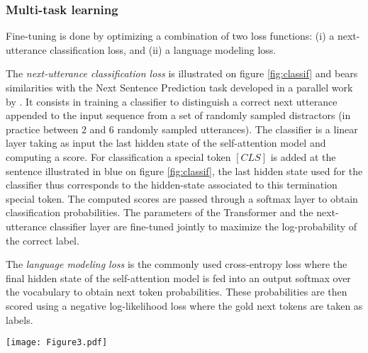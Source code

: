 \documentclass[letterpaper]{article} \usepackage{aaai19}  \usepackage{times}  \usepackage{helvet}  \usepackage{courier}  \usepackage{url}  \usepackage{graphicx}  \usepackage{natbib}
\begin{document}
\subsubsection{Multi-task learning}
Fine-tuning is done by optimizing a combination of two loss functions: (i) a next-utterance classification loss, and (ii) a language modeling loss.

The \textit{next-utterance classification loss} is illustrated on figure \ref{fig:classif} and bears similarities with the Next Sentence Prediction task developed in a parallel work by \citeauthor{devlin_bert:_2018}. It consists in training a classifier to distinguish a correct next utterance appended to the input sequence from a set of randomly sampled distractors (in practice between 2 and 6 randomly sampled utterances). The classifier is a linear layer taking as input the last hidden state of the self-attention model and computing a score. For classification a special token $[CLS]$ is added at the sentence illustrated in blue on figure \ref{fig:classif}, the last hidden state used for the classifier thus corresponds to the hidden-state associated to this termination special token. The computed scores are passed through a softmax layer to obtain classification probabilities. The parameters of the Transformer and the next-utterance classifier layer are fine-tuned jointly to maximize the log-probability of the correct label.

The \textit{language modeling loss} is the commonly used cross-entropy loss where the final hidden state of the self-attention model is fed into an output softmax over the vocabulary to obtain next token probabilities. These probabilities are then scored using a negative log-likelihood loss where the gold next tokens are taken as labels.


\begin{figure*}
	\texttt{[image: Figure3.pdf]}
    \caption{TranferTransfor input representation. The input embeddings is the sum of the word embeddings, the dialog state
embeddings and the positional embeddings.}
    \label{fig:classif}
\end{figure*}
\end{document}

